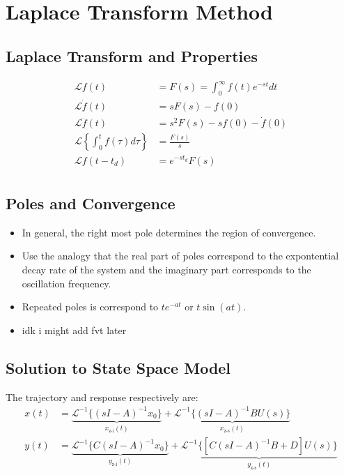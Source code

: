 \documentclass[letterpaper,12pt]{article}
\begin{document}
\section{Laplace Transform Method}
\subsection{Laplace Transform and Properties}
\begin{align*}
    \mathcal{L}{f(t)} &= F(s) = \int_{0}^{\infty} f(t)e^{-st} dt \\
    \mathcal{L}{\dot{f}(t)} &= sF(s) - f(0) \\
    \mathcal{L}{\ddot{f}(t)} &= s^2F(s) - sf(0) - \dot{f}(0) \\
    \mathcal{L}\left\{\int_{0}^{t} f(\tau) d\tau\right\} &= \frac{F(s)}{s} \\
    \mathcal{L}{f(t-t_d)} &= e^{-st_d}F(s) \\
\end{align*}

\subsection{Poles and Convergence}
\begin{itemize}
    \item In general, the right most pole determines the region of convergence. 
    \item Use the analogy that the real part of poles correspond to the expontential decay rate of the system and the imaginary part corresponds to the oscillation frequency.
    \item Repeated poles is correspond to $t e^{-at}$ or $t \sin(at)$.
    \item idk i might add fvt later
\end{itemize}

\subsection{Solution to State Space Model}
The trajectory and response respectively are:
\begin{align*}
    x(t) &= \underbrace{\mathcal{L}^{-1}\{(sI - A)^{-1}x_0\}}_{x_{\text{z-i}}(t)} + \underbrace{\mathcal{L}^{-1}\{(sI - A)^{-1}BU(s)\}}_{x_{\text{z-s}}(t)} \\
    y(t) &= \underbrace{\mathcal{L}^{-1}\{C(sI - A)^{-1}x_0\}}_{y_{\text{z-i}}(t)} + \underbrace{\mathcal{L}^{-1}\{[C(sI - A)^{-1}B + D]U(s)\}}_{y_{\text{z-s}}(t)}
\end{align*}
\end{document}
